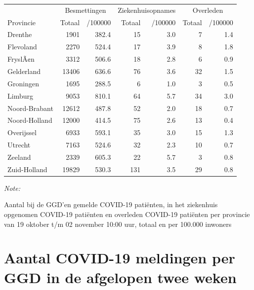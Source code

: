 \documentclass[
  english,
  man,floatsintext]{apa6}
\begin{document}
\begin{table}
\centering
\begin{threeparttable}
\begin{tabular}{lrrrrrr}
\toprule
\multicolumn{1}{c}{ } & \multicolumn{2}{c}{Besmettingen} & \multicolumn{2}{c}{Ziekenhuisopnames} & \multicolumn{2}{c}{Overleden} \\
\cmidrule(l{3pt}r{3pt}){2-3} \cmidrule(l{3pt}r{3pt}){4-5} \cmidrule(l{3pt}r{3pt}){6-7}
Provincie & Totaal & /100000 & Totaal & /100000 & Totaal & /100000\\
\midrule
Drenthe & 1901 & 382.4 & 15 & 3.0 & 7 & 1.4\\
Flevoland & 2270 & 524.4 & 17 & 3.9 & 8 & 1.8\\
FryslÃ¢n & 3312 & 506.6 & 18 & 2.8 & 6 & 0.9\\
Gelderland & 13406 & 636.6 & 76 & 3.6 & 32 & 1.5\\
Groningen & 1695 & 288.5 & 6 & 1.0 & 3 & 0.5\\
Limburg & 9053 & 810.1 & 64 & 5.7 & 34 & 3.0\\
Noord-Brabant & 12612 & 487.8 & 52 & 2.0 & 18 & 0.7\\
Noord-Holland & 12000 & 414.5 & 75 & 2.6 & 13 & 0.4\\
Overijssel & 6933 & 593.1 & 35 & 3.0 & 15 & 1.3\\
Utrecht & 7163 & 524.6 & 32 & 2.3 & 10 & 0.7\\
Zeeland & 2339 & 605.3 & 22 & 5.7 & 3 & 0.8\\
Zuid-Holland & 19829 & 530.3 & 131 & 3.5 & 29 & 0.8\\
\bottomrule
\end{tabular}
\begin{tablenotes}
\item \textit{Note: } 
\item Aantal bij de GGD’en gemelde COVID-19 patiënten, in het ziekenhuis opgenomen COVID-19 patiënten en overleden COVID-19 patiënten per provincie van 19 oktober t/m 02 november 10:00 uur, totaal en per 100.000 inwoners
\end{tablenotes}
\end{threeparttable}
\end{table}

\newpage

\hypertarget{aantal-covid-19-meldingen-per-ggd-in-de-afgelopen-twee-weken}{%
\section{Aantal COVID-19 meldingen per GGD in de afgelopen twee weken}\label{aantal-covid-19-meldingen-per-ggd-in-de-afgelopen-twee-weken}}
\end{document}
